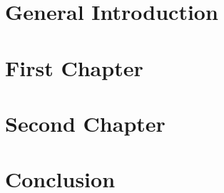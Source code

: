 \chapter*{General Introduction}


\chapter{First Chapter}\label{chapter:first_chapter}


\chapter{Second Chapter}\label{chapter:second_chapter}


\chapter*{Conclusion}


